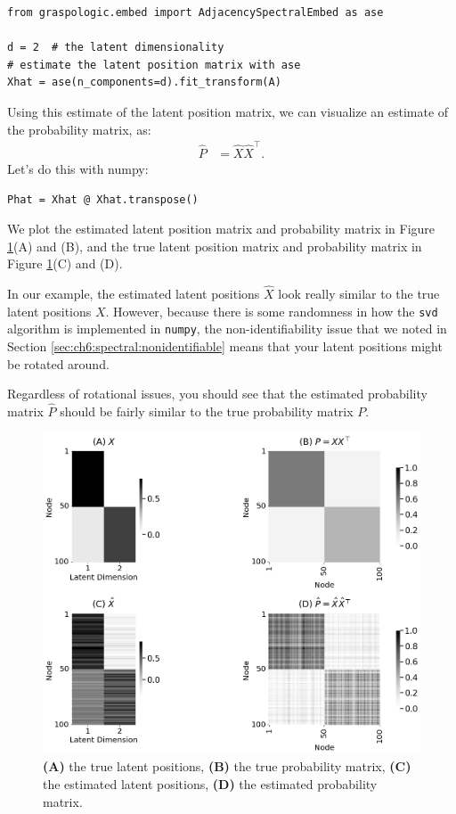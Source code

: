 \begin{lstlisting}[style=python]
from graspologic.embed import AdjacencySpectralEmbed as ase

d = 2  # the latent dimensionality
# estimate the latent position matrix with ase
Xhat = ase(n_components=d).fit_transform(A)
\end{lstlisting}
Using this estimate of the latent position matrix, we can visualize an estimate of the probability matrix, as:
\begin{align*}
    \hat P &= \hat X \hat X^\top.
\end{align*}
Let's do this with numpy:

\begin{lstlisting}[style=python]
Phat = Xhat @ Xhat.transpose()
\end{lstlisting}
We plot the estimated latent position matrix and probability matrix in Figure \ref{fig:ch6:ase:est}(A) and (B), and the true latent position matrix and probability matrix in Figure \ref{fig:ch6:ase:est}(C) and (D).

In our example, the estimated latent positions $\hat X$ look really similar to the true latent positions $X$. However, because there is some randomness in how the \texttt{svd} algorithm is implemented in \texttt{numpy}, the non-identifiability issue that we noted in Section \ref{sec:ch6:spectral:nonidentifiable} means that your latent positions might be rotated around.

Regardless of rotational issues, you should see that the estimated probability matrix $\hat P$ should be fairly similar to the true probability matrix $P$.

\begin{figure}[h]
    \centering
    \includegraphics[width=0.7\linewidth]{representations/ch6/Images/ase_result.png}
    \caption[Comparison of ASE estimate to true prob. matrix]{\textbf{(A)} the true latent positions, \textbf{(B)} the true probability matrix, \textbf{(C)} the estimated latent positions, \textbf{(D)} the estimated probability matrix.}
    \label{fig:ch6:ase:est}
\end{figure}

